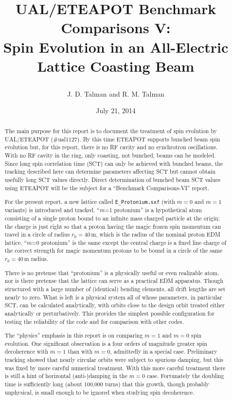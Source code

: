\documentclass[]{article}
\begin{document}
\date{July 21, 2014}

\title{
\centerline{}
\centerline{}
\centerline{}
UAL/ETEAPOT Benchmark Comparisons V: \\ 
Spin Evolution in an All-Electric Lattice
Coasting Beam}
\author{J. D. Talman and R. M. Talman
}

\maketitle

%
\begin{abstract}
The main purpose for this report is to document the treatment of
spin evolution by UAL/ETEAPOT (\#ual1127). By this time ETEAPOT supports
bunched beam spin evolution but, for this report, there is
no RF cavity and no synchrotron oscillations. With no RF cavity in 
the ring, only coasting, not bunched, beams can be modeled. 
Since long spin correlation time (SCT) can only be achieved with 
bunched beams, the tracking described here can determine parameters 
affecting 
SCT but cannot obtain usefully long SCT values directly. Direct 
determination of bunched beam SCT values using ETEAPOT will be 
the subject for a ``Benchmark Comparisons-VI'' report.

For the present report, a new lattice called {\tt E\_Protonium.sxf}
(with $m=0$ and $m=1$ variants) is introduced and tracked.
``$m$=1 protonium'' is a hypothetical atom consisting of a 
single proton bound to an infinite mass charged particle at the 
origin; the charge is just right so that a proton having the 
magic frozen spin momentum can travel in a circle of radius $r_0=40\,$m, 
which is the radius of the nominal proton EDM lattice. 
``$m$=0 protonium'' is the same except the central charge is a fixed
line charge of the correct strength for magic momentum protons
to be bound in a circle of the same $r_0=40\,$m radius.

There is no pretense that ``protonium'' is a physically useful
or even realizable atom, nor is there pretense that the
lattice can serve as a practical EDM apparatus.
Though structured with a large number of (identical) bending 
elements, all drift lengths are set nearly to zero. What is left
is a physical system all of whose parameters, in particular
SCT, can be calculated analytically, with orbits close to the
design orbit treated either analytically or perturbatively. 
This provides the
simplest possible configuration for testing the reliability
of the code and for comparison with other codes.

The ``physics'' emphasis in this report is on comparing $m=1$ and $m=0$
spin evolution. One significant observation is a four orders
of magnitude greater spin decoherence with $m=1$ than with $m=0$,
admittedly in a special case. Preliminary tracking showed that
nearly circular orbits were subject to spurious damping, but this
was fixed by more careful numerical treatment. With this
more careful treatment there is still a hint of horizontal
(anti-)damping in the $m=0$ case. Fortunately the doubling 
time is sufficiently long (about 100,000 turns) that this growth,
though probably unphysical, is small enough to be ignored 
when studying spin decoherence.
\end{abstract}
%
\end{document}
